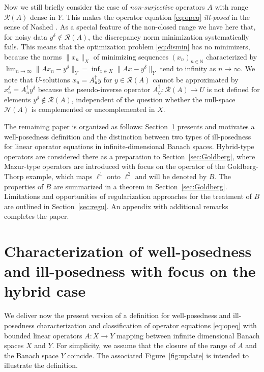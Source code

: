 \documentclass[12pt,twoside,reqno]{amsart}
\theoremstyle{definition}
\numberwithin{equation}{section}
\begin{document}
Now we still briefly consider the case of \emph{non-surjective} operators $A$ with range $\mathcal{R}(A)$ dense in $Y$. This makes the operator equation \eqref{eq:opeq} \emph{ill-posed} in the sense of Nashed \cite{Nashed86}. As a special feature of the non-closed range we have here that, for noisy data  $y^\delta \notin \mathcal{R}(A)$, the discrepancy norm minimization systematically fails. This means that the optimization problem \eqref{eq:dismin} has no minimizers, because the norms $\|x_n\|_X$ of minimizing sequences $(x_n)_{n \in \mathbb{N}}$ characterized by $\lim_{n \to \infty}\|Ax_n-y^\delta\|_Y = \inf_{x \in X}\|Ax-y^\delta\|_Y$ tend to infinity as $n \to \infty$. We note that $U$-solutions $x_u=A_u^\dagger y$ for $y \in \mathcal{R}(A)$ cannot be approximated
by $x^\delta_u=A_u^\dagger y^\delta$ because the pseudo-inverse operator $A^\dagger_U: \mathcal{R}(A) \to U$ is not defined for elements $y^\delta \notin \mathcal{R}(A)$, independent of the question whether the null-space $\mathcal{N}(A)$ is complemented or uncomplemented in $X$.

The remaining paper is organized as follows: Section~\ref{sec:def} presents and motivates a well-posedness definition and the distinction between two types of ill-posedness for linear operator equations in infinite-dimensional Banach spaces. Hybrid-type operators are considered there as a preparation to Section~\ref{sec:Goldberg}, where Mazur-type operators are introduced with focus on the operator of the Goldberg-Thorp example, which maps $\ell^1$ onto $\ell^2$ and will be denoted by $B$. The properties of $B$ are summarized in a theorem in Section~\ref{sec:Goldberg}. Limitations and opportunities of regularization approaches for the treatment of $B$ are outlined in Section~\ref{sec:regu}. An appendix with additional remarks completes the paper.

\section{Characterization of well-posedness and ill-posedness with focus on the hybrid case} \label{sec:def}

We deliver now the present version of a definition for well-posedness
 and ill-posedness characterization and classification of operator equations \eqref{eq:opeq} with bounded linear operators $A: X \to Y$ mapping between infinite dimensional Banach spaces $X$ and $Y$. For simplicity, we assume that the closure of the range of $A$ and the Banach space $Y$ coincide. The associated Figure~\ref{fig:update} is intended to illustrate the definition.
\end{document}
